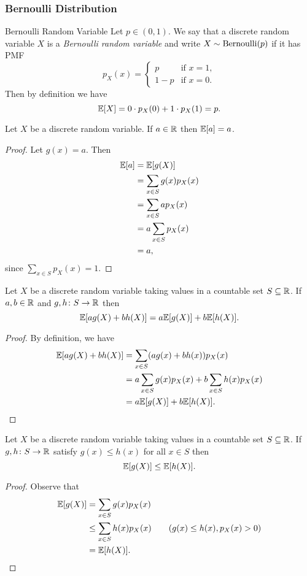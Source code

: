 \documentclass[class=article, crop=false]{standalone}
\begin{document}
  \subsubsection{Bernoulli Distribution}
  \begin{definition}{Bernoulli Random Variable}
    Let $p\in (0, 1)$. We say that a discrete random variable $X$ is a \emph{Bernoulli random variable} and write $X\sim \operatorname{Bernoulli}(p)$ if it has PMF
    \[
      p_X(x) = \begin{cases}
        p & \text{if }x = 1, \\
        1 - p & \text{if }x = 0.
      \end{cases}
    \]
    Then by definition we have
    \[
      \mathbb{E}[X] = 0\cdot p_X(0) + 1\cdot p_X(1) = p.
    \]
  \end{definition}
  Let $X$ be a discrete random variable. If $a\in\mathbb{R}$ then $\mathbb{E}[a] = a$.
  \begin{proof}
    Let $g(x) = a$. Then
    \begin{align*}
      \mathbb{E}[a] &= \mathbb{E}[g(X)] \\
            &= \sum_{x\in S} g(x)p_X(x) \\
            &= \sum_{x\in S}ap_X(x) \\
            &= a\sum_{x\in S}p_X(x) \\
            &= a,
    \end{align*}
    since $\sum\limits_{x\in S}p_X(x) = 1$.
  \end{proof}
  Let $X$ be a discrete random variable taking values in a countable set $S\subseteq\mathbb{R}$. If $a, b\in \mathbb{R}$ and $g, h\colon S\to \mathbb{R}$ then
  \[
    \mathbb{E}[ag(X) + bh(X)] = a\mathbb{E}[g(X)] + b\mathbb{E}[h(X)].
  \]
  \begin{proof}
    By definition, we have
    \begin{align*}
      \mathbb{E}[ag(X) + bh(X)] &= \sum_{x\in S}(ag(x) + bh(x))p_X(x) \\
                        &= a\sum_{x\in S}g(x)p_X(x) + b\sum_{x\in S}h(x)p_X(x) \\
                        &= a\mathbb{E}[g(X)] + b\mathbb{E}[h(X)].
    \end{align*}
  \end{proof}
  Let $X$ be a discrete random variable taking values in a countable set $S\subseteq \mathbb{R}$. If $g, h\colon S\to \mathbb{R}$ satisfy $g(x) \leq h(x)$ for all $x\in S$ then
  \[
    \mathbb{E}[g(X)] \leq \mathbb{E}[h(X)].
  \]
  \begin{proof}
    Observe that
    \begin{align*}
      \mathbb{E}[g(X)] &= \sum_{x\in S}g(x)p_X(x) \\
               &\leq \sum_{x\in S}h(x)p_X(x) \tag{$g(x) \leq h(x), p_X(x) > 0$}\\
               &= \mathbb{E}[h(X)].
    \end{align*}
  \end{proof}
\end{document}

